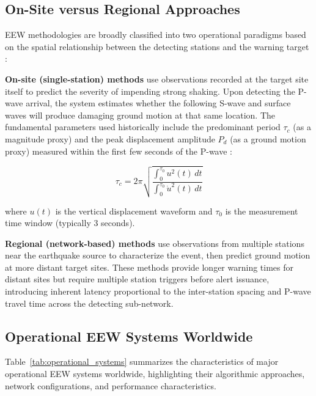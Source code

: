 \documentclass[review,authoryear]{elsarticle}
\begin{document}
\subsection{On-Site versus Regional Approaches}

EEW methodologies are broadly classified into two operational paradigms based on the spatial relationship between the detecting stations and the warning target \citep{satriano2011earthquake, allen2019earthquake}:

\textbf{On-site (single-station) methods} use observations recorded at the target site itself to predict the severity of impending strong shaking. Upon detecting the P-wave arrival, the system estimates whether the following S-wave and surface waves will produce damaging ground motion at that same location. The fundamental parameters used historically include the predominant period $\tau_c$ (as a magnitude proxy) and the peak displacement amplitude $P_d$ (as a ground motion proxy) measured within the first few seconds of the P-wave \citep{wu2005experiment, wu2006magnitude}:

\begin{equation}
\tau_c = 2\pi \sqrt{\frac{\int_0^{\tau_0} u^2(t) \, dt}{\int_0^{\tau_0} \dot{u}^2(t) \, dt}}
\label{eq:tau_c}
\end{equation}

\noindent where $u(t)$ is the vertical displacement waveform and $\tau_0$ is the measurement time window (typically 3 seconds).

\textbf{Regional (network-based) methods} use observations from multiple stations near the earthquake source to characterize the event, then predict ground motion at more distant target sites. These methods provide longer warning times for distant sites but require multiple station triggers before alert issuance, introducing inherent latency proportional to the inter-station spacing and P-wave travel time across the detecting sub-network.

\subsection{Operational EEW Systems Worldwide}

Table~\ref{tab:operational_systems} summarizes the characteristics of major operational EEW systems worldwide, highlighting their algorithmic approaches, network configurations, and performance characteristics.
\end{document}
